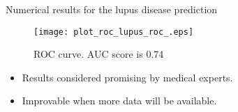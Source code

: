 \begin{frame}{Numerical results for the lupus disease prediction}

\begin{figure}
	\centering
		\texttt{[image: plot\_roc\_lupus\_roc\_.eps]}
		\caption{ROC curve. AUC score is 0.74}
		\label{fig:lupus_roc}
\end{figure}

\begin{itemize}
	\item Results considered promising by medical experts.
	\item Improvable when more data will be available.
\end{itemize}

\end{frame}


 
